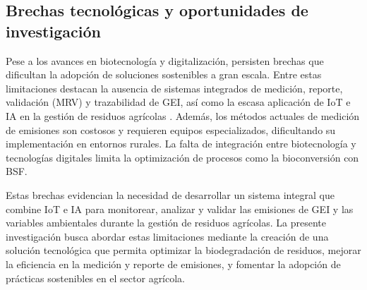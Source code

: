 \subsection{Brechas tecnológicas y oportunidades de investigación}

Pese a los avances en biotecnología y digitalización, persisten brechas que dificultan la adopción de soluciones sostenibles a gran escala. Entre estas limitaciones destacan la ausencia de sistemas integrados de medición, reporte, validación (MRV) y trazabilidad de GEI, así como la escasa aplicación de IoT e IA en la gestión de residuos agrícolas \parencite{IPCC2014}. Además, los métodos actuales de medición de emisiones son costosos y requieren equipos especializados, dificultando su implementación en entornos rurales. La falta de integración entre biotecnología y tecnologías digitales limita la optimización de procesos como la bioconversión con BSF.

Estas brechas evidencian la necesidad de desarrollar un sistema integral que combine IoT e IA para monitorear, analizar y validar las emisiones de GEI y las variables ambientales durante la gestión de residuos agrícolas. La presente investigación busca abordar estas limitaciones mediante la creación de una solución tecnológica que permita optimizar la biodegradación de residuos, mejorar la eficiencia en la medición y reporte de emisiones, y fomentar la adopción de prácticas sostenibles en el sector agrícola.